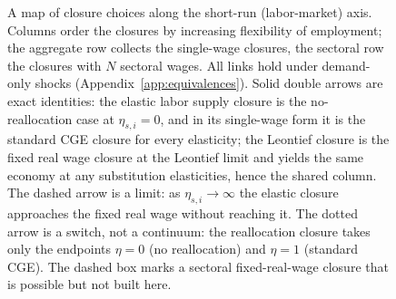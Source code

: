 \begin{figure}[htbp]
\caption{A map of closure choices along the short-run (labor-market)
  axis. Columns order the closures by increasing flexibility of employment;
  the aggregate row collects the single-wage closures, the sectoral row the
  closures with $N$ sectoral wages. All links hold under demand-only shocks
  (Appendix~\ref{app:equivalences}). Solid double arrows are exact
  identities: the elastic labor supply closure is the no-reallocation case
  at $\eta_{s,i} = 0$, and in its single-wage form it is the standard CGE
  closure for every elasticity; the Leontief closure is the fixed real wage
  closure at the Leontief limit and yields the same economy at any
  substitution elasticities, hence the shared column. The dashed arrow is a
  limit: as $\eta_{s,i} \to \infty$ the elastic closure approaches the fixed
  real wage without reaching it. The dotted arrow is a switch, not a
  continuum: the reallocation closure takes only the endpoints $\eta = 0$
  (no reallocation) and $\eta = 1$ (standard CGE). The dashed box marks a
  sectoral fixed-real-wage closure that is possible but not built here.}
\label{fig:flexibility-map-alt}
\end{figure}
